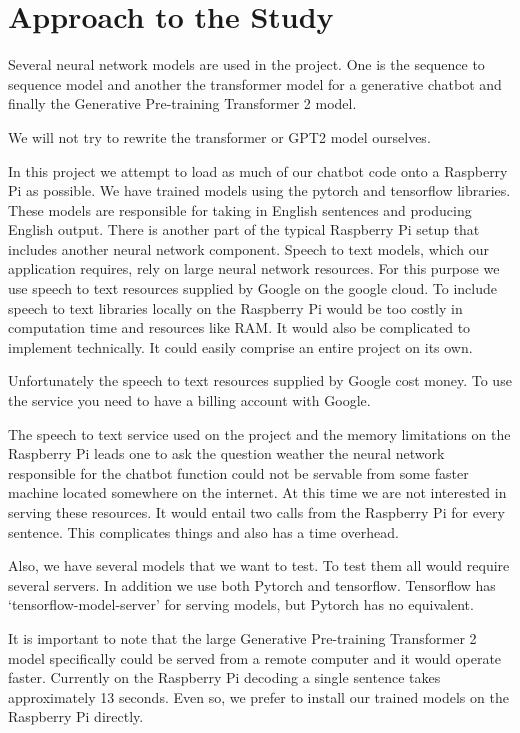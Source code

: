 \section{Approach to the Study}

Several neural network models are used in the project. One is the sequence to sequence model and another the transformer model for a generative chatbot and finally the Generative Pre-training Transformer 2 model.

We will not try to rewrite the transformer or GPT2 model ourselves.

In this project we attempt to load as much of our chatbot code onto a Raspberry Pi as possible. We have trained models using the pytorch and tensorflow libraries. These models are responsible for taking in English sentences and producing English output. There is another part of the typical Raspberry Pi setup that includes another neural network component. Speech to text models, which our application requires, rely on large neural network resources. For this purpose we use speech to text resources supplied by Google on the google cloud. To include speech to text libraries locally on the Raspberry Pi would be too costly in computation time and resources like RAM. It would also be complicated to implement technically. It could easily comprise an entire project on its own.

Unfortunately the speech to text resources supplied by Google cost money. To use the service you need to have a billing account with Google.

The speech to text service used on the project and the memory limitations on the Raspberry Pi leads one to ask the question weather the neural network responsible for the chatbot function could not be servable from some faster machine located somewhere on the internet. At this time we are not interested in serving these resources. It would entail two calls from the Raspberry Pi for every sentence. This complicates things and also has a time overhead. 

Also, we have several models that we want to test. To test them all would require several servers. In addition we use both Pytorch and tensorflow. Tensorflow has `tensorflow-model-server' for serving models, but Pytorch has no equivalent.

It is important to note that the large Generative Pre-training Transformer 2 model specifically could be served from a remote computer and it would operate faster. Currently on the Raspberry Pi decoding a single sentence takes approximately 13 seconds. Even so, we prefer to install our trained models on the Raspberry Pi directly.

